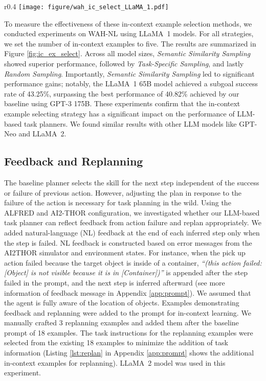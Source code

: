 \begin{wrapfigure}[15]{r}{0.4\textwidth}
\centering
\vspace{-5mm}
\texttt{[image: figure/wah\_ic\_select\_LLaMA\_1.pdf]}
\vspace{-8mm}
\caption{Subgoal success rate for different in-context example selection strategies. The dashed line represents the best performance of our baseline planner using GPT-3 175B.}
\label{fig:ic_ex_select}
\end{wrapfigure}
To measure the effectiveness of these in-context example selection methods, we conducted experiments on WAH-NL using LLaMA~1 models. For all strategies, we set the number of in-context examples to five. The results are summarized in Figure \ref{fig:ic_ex_select}. Across all model sizes, \textit{Semantic Similarity Sampling} showed superior performance, followed by \textit{Task-Specific Sampling}, and lastly \textit{Random Sampling}. Importantly, \textit{Semantic Similarity Sampling} led to significant performance gains; notably, the LLaMA~1 65B model achieved a subgoal success rate of 43.25\%, surpassing the best performance of 40.82\% achieved by our baseline using GPT-3 175B. These experiments confirm that the in-context example selecting strategy has a significant impact on the performance of LLM-based task planners. We found similar results with other LLM models like GPT-Neo and LLaMA~2.

\subsection{Feedback and Replanning}
\label{subsec:feedback_and_replanning}
The baseline planner selects the skill for the next step independent of the success or failure of previous action. However, adjusting the plan in response to the failure of the action is necessary for task planning in the wild. 
Using the ALFRED and AI2-THOR configuration, we investigated whether our LLM-based task planner can reflect feedback from action failure and replan appropriately.
We added natural-language (NL) feedback at the end of each inferred step only when the step is failed. NL feedback is constructed based on error messages from the AI2THOR simulator and environment states.
For instance, when the pick up action failed because the target object is inside of a container, \textit{``(this action failed: [Object] is not visible because it is in [Container])''} is appended after the step failed in the prompt, and the next step is inferred afterward (see more information of feedback message in Appendix \ref{app:prompt}).
We assumed that the agent is fully aware of the location of objects.
Examples demonstrating feedback and replanning were added to the prompt for in-context learning. We manually crafted 3 replanning examples and added them after the baseline prompt of 18 examples. The task instructions for the replanning examples were selected from the existing 18 examples to minimize the addition of task information (Listing \ref{lst:replan} in Appendix \ref{app:prompt} shows the additional in-context examples for replanning).
LLaMA~2 model was used in this experiment.

